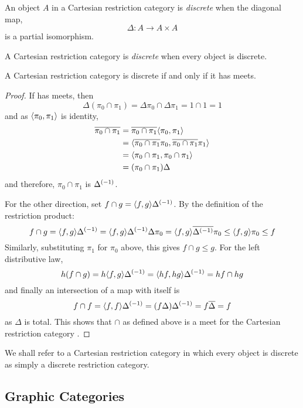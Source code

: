 \begin{definition}
  An object $A$ in a Cartesian restriction category is \emph{discrete}
  when the diagonal map,
  \[
    \Delta:A \to A \times A
  \]
  is a partial isomorphism.

  A Cartesian restriction category is \emph{discrete} when every object is discrete.
\end{definition}

\begin{theorem}\label{thm:a_crc_is_discrete_iff_it_has_meets}
  A Cartesian restriction category \X is discrete if and only if it has meets.
\end{theorem}
\begin{proof}
  If \X has meets, then
  \[
    \Delta(\pi_0 \cap \pi_1) = \Delta\pi_0 \cap \Delta\pi_1 = 1\cap 1 = 1
  \]
  and as $\langle\pi_0,\pi_1\rangle$ is identity,
  \begin{align*}
    \overline{\pi_0 \cap \pi_1} &= \overline{\pi_0 \cap \pi_1} \langle\pi_0, \pi_1\rangle \\
    &=\langle\overline{\pi_0 \cap \pi_1}\pi_0, \overline{\pi_0 \cap \pi_1}\pi_1\rangle\\
    &=\langle\pi_0 \cap \pi_1,\pi_0 \cap \pi_1\rangle\\
    &=(\pi_0 \cap \pi_1 )\Delta
  \end{align*}
  and therefore, $\pi_0 \cap \pi_1$ is ${\Delta}^{(-1)}$.

  For the other direction, set $f\cap g = \langle f,g\rangle{\Delta}^{(-1)}$.
  By the definition of the restriction product:
  \[
    f \cap g =  \langle f,g\rangle{\Delta}^{(-1)} =\langle f,g\rangle{\Delta}^{(-1)} \Delta \pi_0 =
      \langle f,g\rangle\overline{{\Delta}^{(-1)}}\pi_0 \le \langle f,g\rangle\pi_0 \le f
  \]
  Similarly, substituting $\pi_1$ for $\pi_0$ above, this gives $f \cap g \le g$.
  For the left distributive law,
  \[
    h(f \cap g) = h \langle f,g\rangle{\Delta}^{(-1)} =  \langle h f,h g\rangle{\Delta}^{(-1)} = h f \cap h g
  \]
  and finally an intersection of a map with itself is
  \[
    f\cap f = \langle f,f\rangle {\Delta}^{(-1)} = (f \Delta) {\Delta}^{(-1)} = f \overline{\Delta} = f
  \]
  as $\Delta$ is total. This shows that $\cap$ as defined above is a meet for the
  Cartesian restriction category \X.

\end{proof}

We shall refer to a Cartesian restriction category in which every object is
discrete as simply a discrete restriction category.

\subsection{Graphic Categories} %
\label{sub:graphic_categories}


